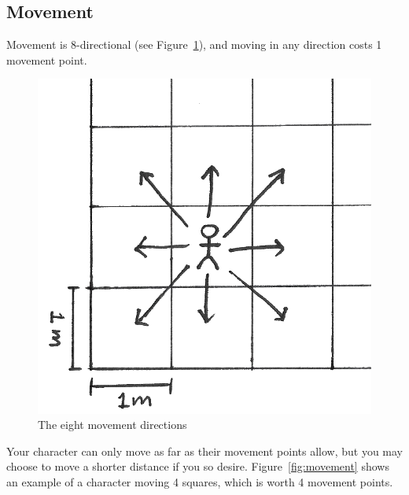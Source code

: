 \subsection{Movement}\label{sec:movement}
Movement is 8-directional (see Figure~\ref{fig:directions}), and moving in any direction costs 1 movement point.

\begin{figure}
    \centering
    \includegraphics{graphics/directions-trans.png}
    \caption{The eight movement directions}
    \label{fig:directions}
\end{figure}

Your character can only move as far as their movement points allow, but you may choose to move a shorter distance if you so desire.
Figure~\ref{fig:movement} shows an example of a character moving 4 squares, which is worth 4 movement points.

